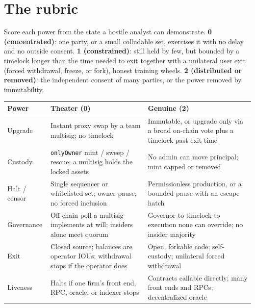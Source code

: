 \documentclass[11pt,a4paper]{article}
\newcommand{\code}[1]{\texttt{\small #1}}
\begin{document}
\section{The rubric}

Score each power from the state a hostile analyst can demonstrate. \textbf{0
(concentrated)}: one party, or a small colludable set, exercises it with no delay and
no outside consent. \textbf{1 (constrained)}: still held by few, but bounded by a
timelock longer than the time needed to exit together with a unilateral user exit
(forced withdrawal, freeze, or fork), honest training wheels. \textbf{2 (distributed
or removed)}: the independent consent of many parties, or the power removed by
immutability.

\begin{table}[h]\footnotesize\setlength{\tabcolsep}{5pt}\renewcommand{\arraystretch}{1.1}
\begin{tabularx}{\linewidth}{@{}l Y Y@{}}
\toprule
\textbf{Power} & \textbf{Theater (0)} & \textbf{Genuine (2)}\\
\midrule
Upgrade & Instant proxy swap by a team multisig; no timelock & Immutable, or upgrade only via a broad on-chain vote plus a timelock past exit time\\
Custody & \code{onlyOwner} mint / sweep / rescue; a multisig holds the locked assets & No admin can move principal; mint capped or removed\\
Halt / censor & Single sequencer or whitelisted set; owner pause; no forced inclusion & Permissionless production, or a bounded pause with an escape hatch\\
Governance & Off-chain poll a multisig implements at will; insiders alone meet quorum & Governor to timelock to execution none can override; no insider majority\\
Exit & Closed source; balances are operator IOUs; withdrawal stops if the operator does & Open, forkable code; self-custody; unilateral forced withdrawal\\
Liveness & Halts if one firm's front end, RPC, oracle, or indexer stops & Contracts callable directly; many front ends and RPCs; decentralized oracle\\
\bottomrule
\end{tabularx}
\end{table}
\end{document}

